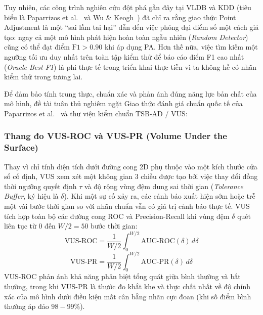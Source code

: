 \documentclass[11pt,journal,onecolumn]{IEEEtran}
\begin{document}
Tuy nhiên, các công trình nghiên cứu đột phá gần đây tại VLDB và KDD (tiêu biểu là Paparrizos et al.~\cite{paparrizos2022tsb} và Wu \& Keogh~\cite{wu2021current}) đã chỉ ra rằng giao thức Point Adjustment là một ``sai lầm tai hại'' dẫn đến việc phóng đại điểm số một cách giả tạo: ngay cả một mô hình phát hiện hoàn toàn ngẫu nhiên (\textit{Random Detector}) cũng có thể đạt điểm $\text{F1} > 0.90$ khi áp dụng PA. Hơn thế nữa, việc tìm kiếm một ngưỡng tối ưu duy nhất trên toàn tập kiểm thử để báo cáo điểm F1 cao nhất (\textit{Oracle Best-F1}) là phi thực tế trong triển khai thực tiễn vì ta không hề có nhãn kiểm thử trong tương lai.

Để đảm bảo tính trung thực, chuẩn xác và phản ánh đúng năng lực bản chất của mô hình, đề tài tuân thủ nghiêm ngặt Giao thức đánh giá chuẩn quốc tế của Paparrizos et al.~\cite{paparrizos2022tsb} và thư viện kiểm chuẩn TSB-AD / VUS:

\subsubsection{Thang đo VUS-ROC và VUS-PR (Volume Under the Surface)}
Thay vì chỉ tính diện tích dưới đường cong 2D phụ thuộc vào một kích thước cửa sổ cố định, VUS xem xét một không gian 3 chiều được tạo bởi việc thay đổi đồng thời ngưỡng quyết định $\tau$ và độ rộng vùng đệm dung sai thời gian (\textit{Tolerance Buffer}, ký hiệu là $\delta$).
Khi một sự cố xảy ra, các cảnh báo xuất hiện sớm hoặc trễ một vài bước thời gian so với nhãn chuẩn vẫn có giá trị cảnh báo thực tế. VUS tích hợp toàn bộ các đường cong ROC và Precision-Recall khi vùng đệm $\delta$ quét liên tục từ 0 đến $W / 2 = 50$ bước thời gian:
\begin{equation}
\label{eq:vus_roc}
\text{VUS-ROC} = \frac{1}{W/2} \int_0^{W/2} \text{AUC-ROC}(\delta) \, d\delta
\end{equation}
\begin{equation}
\label{eq:vus_pr}
\text{VUS-PR} = \frac{1}{W/2} \int_0^{W/2} \text{AUC-PR}(\delta) \, d\delta
\end{equation}
VUS-ROC phản ánh khả năng phân biệt tổng quát giữa bình thường và bất thường, trong khi VUS-PR là thước đo khắt khe và thực chất nhất về độ chính xác của mô hình dưới điều kiện mất cân bằng nhãn cực đoan (khi số điểm bình thường áp đảo $98-99\%$).
\end{document}
